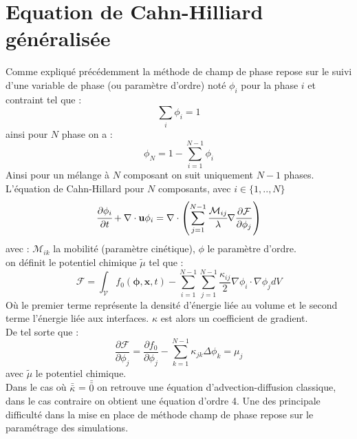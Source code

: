 \documentclass[a4paper,11pt,fleqn]{report}    %
\newcommand{\doubleoverline}[1]{\bar{\bar{#1}}} 			%
\begin{document}
\section{Equation de Cahn-Hilliard généralisée}
Comme expliqué précédemment la méthode de champ de phase repose sur le suivi d'une variable de phase (ou paramètre d'ordre) noté $\phi_i$ pour la phase $i$ et contraint tel que : 
\begin{equation}
\sum_i \phi_i =1
\end{equation} 
ainsi pour $N$ phase on a :
\begin{equation}
\phi_N =1 - \sum_{i=1}^{N-1} \phi_i
\end{equation} 
Ainsi pour un mélange à $N$ composant on suit uniquement $N-1$ phases.
L'équation de Cahn-Hillard pour $N$ composants, avec $i\in \{1,..,N \}$
\begin{equation}
\cfrac{\partial \phi_i}{\partial t} + \nabla \cdot \mathbf{u}\phi_i=  \nabla \cdot \left(\sum_{j=1}^{N-1} \cfrac{\mathcal{M}_{ij}}{\lambda} \nabla \frac{\partial \mathcal{F}}{\partial \phi_j} \right)
\end{equation}
avec : $\mathcal{M}_{ik}$ la mobilité (paramètre cinétique),  $\phi$ le paramètre d'ordre. \\
on définit le potentiel chimique $\tilde\mu$ tel que : \begin{equation}
\mathcal{F} = \int_{\mathcal{V}}f_0(\bm{\phi},\mathbf{x},t)- \sum_{i=1}^{N-1}\sum_{j=1}^{N-1}\frac{\kappa_{ij}}{2}\nabla \phi_i \cdot \nabla \phi_j dV
\end{equation}
Où le premier terme représente la densité d'énergie liée au volume et le second terme l'énergie liée aux interfaces. $\kappa$ est alors un coefficient de gradient. \\
De tel sorte que : 
\begin{equation}\label{eq_potentiel}
	\frac{\partial \mathcal{F}}{\partial \phi_j} = \frac{\partial f_0}{\partial \phi_j} -\sum_{k=1}^{N-1} \kappa_{jk} \Delta \phi_k = {\mu}_j
\end{equation}
avec $\tilde{\mu}$ le potentiel chimique. \\
Dans le cas où $\doubleoverline{\kappa}$ = $\doubleoverline{0}$ on retrouve une équation d'advection-diffusion classique, dans le cas contraire on obtient une équation d'ordre 4. Une des principale difficulté dans la mise en place de méthode champ de phase repose sur le paramétrage des simulations.
\end{document}
